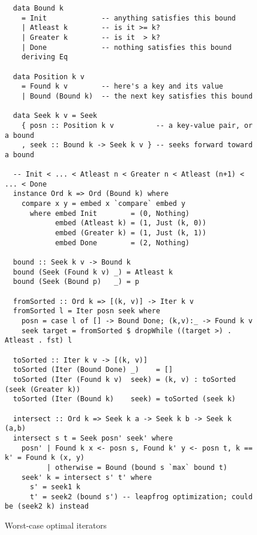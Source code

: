 \documentclass[acmsmall,screen,review,anonymous,dvipsnames]{acmart}
\begin{document}
\begin{figure}
  \begin{verbatim}
  data Bound k
    = Init             -- anything satisfies this bound
    | Atleast k        -- is it >= k?
    | Greater k        -- is it  > k?
    | Done             -- nothing satisfies this bound
    deriving Eq

  data Position k v
    = Found k v        -- here's a key and its value
    | Bound (Bound k)  -- the next key satisfies this bound

  data Seek k v = Seek
    { posn :: Position k v          -- a key-value pair, or a bound
    , seek :: Bound k -> Seek k v } -- seeks forward toward a bound

  -- Init < ... < Atleast n < Greater n < Atleast (n+1) < ... < Done
  instance Ord k => Ord (Bound k) where
    compare x y = embed x `compare` embed y
      where embed Init        = (0, Nothing)
            embed (Atleast k) = (1, Just (k, 0))
            embed (Greater k) = (1, Just (k, 1))
            embed Done        = (2, Nothing)

  bound :: Seek k v -> Bound k
  bound (Seek (Found k v) _) = Atleast k
  bound (Seek (Bound p)   _) = p

  fromSorted :: Ord k => [(k, v)] -> Iter k v
  fromSorted l = Iter posn seek where
    posn = case l of [] -> Bound Done; (k,v):_ -> Found k v
    seek target = fromSorted $ dropWhile ((target >) . Atleast . fst) l

  toSorted :: Iter k v -> [(k, v)]
  toSorted (Iter (Bound Done) _)    = []
  toSorted (Iter (Found k v)  seek) = (k, v) : toSorted (seek (Greater k))
  toSorted (Iter (Bound k)    seek) = toSorted (seek k)

  intersect :: Ord k => Seek k a -> Seek k b -> Seek k (a,b)
  intersect s t = Seek posn' seek' where
    posn' | Found k x <- posn s, Found k' y <- posn t, k == k' = Found k (x, y)
          | otherwise = Bound (bound s `max` bound t)
    seek' k = intersect s' t' where
      s' = seek1 k
      t' = seek2 (bound s') -- leapfrog optimization; could be (seek2 k) instead
  \end{verbatim}
  \caption{Worst-case optimal iterators}
\end{figure}



\end{document}
